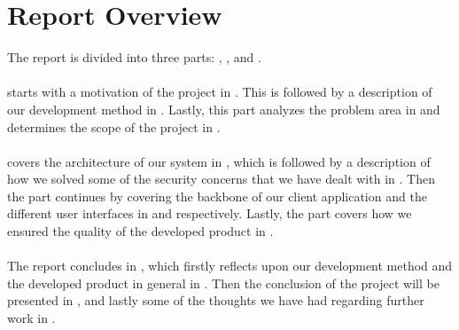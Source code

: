 
\section*{Report Overview}
\label{sec:report_overview}

The report is divided into three parts: \emph{}, \emph{}, and \emph{}.
\\\\
 starts with a motivation of the project in . This is followed by a description of our development method in . Lastly, this part analyzes the problem area in  and determines the scope of the project in . 
\\\\
 covers the architecture of our system in , which is followed by a description of how we solved some of the security concerns that we have dealt with in . Then the part continues by covering the backbone of our client application and the different user interfaces in  and  respectively. Lastly, the part covers how we ensured the quality of the developed product in .
\\\\
The report concludes in , which firstly reflects upon our development method and the developed product in general in . Then the conclusion of the project will be presented in , and lastly some of the thoughts we have had regarding further work in .